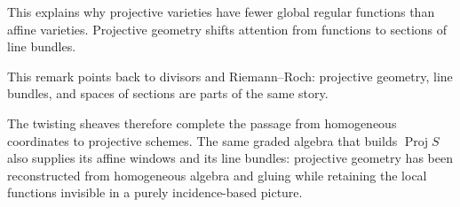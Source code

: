 This explains why projective varieties have fewer global regular functions than affine varieties.  Projective geometry shifts attention from functions to sections of line bundles.

This remark points back to divisors and Riemann--Roch: projective geometry, line bundles, and spaces of sections are parts of the same story.

The twisting sheaves therefore complete the passage from homogeneous coordinates to projective schemes.  The same graded algebra that builds \(\operatorname{Proj}S\) also supplies its affine windows and its line bundles: projective geometry has been reconstructed from homogeneous algebra and gluing while retaining the local functions invisible in a purely incidence-based picture.
